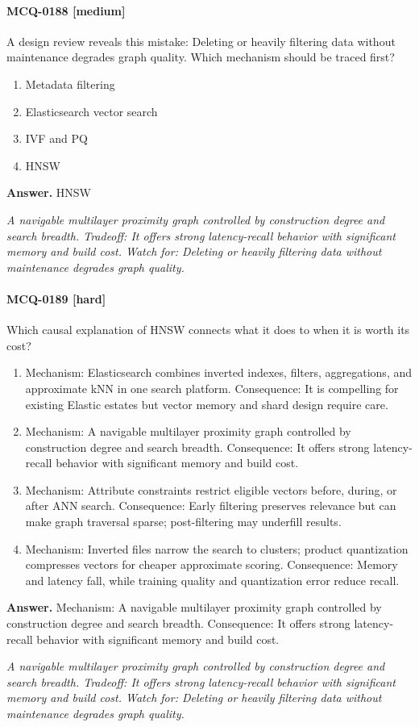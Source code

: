 \paragraph{MCQ-0188 [medium]} A design review reveals this mistake: Deleting or heavily filtering data without maintenance degrades graph quality. Which mechanism should be traced first?
\begin{enumerate}[label=\Alph*.]
\item Metadata filtering
\item Elasticsearch vector search
\item IVF and PQ
\item HNSW
\end{enumerate}
\noindent\textbf{Answer.} HNSW
\par\textit{A navigable multilayer proximity graph controlled by construction degree and search breadth. Tradeoff: It offers strong latency-recall behavior with significant memory and build cost. Watch for: Deleting or heavily filtering data without maintenance degrades graph quality.}
\paragraph{MCQ-0189 [hard]} Which causal explanation of HNSW connects what it does to when it is worth its cost?
\begin{enumerate}[label=\Alph*.]
\item Mechanism: Elasticsearch combines inverted indexes, filters, aggregations, and approximate kNN in one search platform. Consequence: It is compelling for existing Elastic estates but vector memory and shard design require care.
\item Mechanism: A navigable multilayer proximity graph controlled by construction degree and search breadth. Consequence: It offers strong latency-recall behavior with significant memory and build cost.
\item Mechanism: Attribute constraints restrict eligible vectors before, during, or after ANN search. Consequence: Early filtering preserves relevance but can make graph traversal sparse; post-filtering may underfill results.
\item Mechanism: Inverted files narrow the search to clusters; product quantization compresses vectors for cheaper approximate scoring. Consequence: Memory and latency fall, while training quality and quantization error reduce recall.
\end{enumerate}
\noindent\textbf{Answer.} Mechanism: A navigable multilayer proximity graph controlled by construction degree and search breadth. Consequence: It offers strong latency-recall behavior with significant memory and build cost.
\par\textit{A navigable multilayer proximity graph controlled by construction degree and search breadth. Tradeoff: It offers strong latency-recall behavior with significant memory and build cost. Watch for: Deleting or heavily filtering data without maintenance degrades graph quality.}
